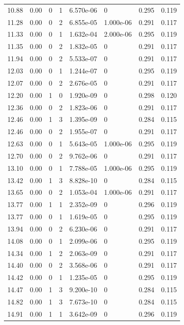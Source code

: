 \documentclass[preview]{standalone}
\begin{document}
{{{\begin{tabular}{L{1.2cm}C{1.2cm} C{0.3cm}C{0.5cm} C{1.4cm}C{1.4cm} C{1.4cm}C{1.4cm}}
  10.88  &  0.00  & 0     &  1 &  6.570e-06  & 0  & 0.295 &  0.119   \\ 
  11.28  &  0.00  & 0     &  2 &  6.855e-05  & 1.000e-06  & 0.291 &  0.117   \\ 
  11.33  &  0.00  & 0     &  1 &  1.632e-04  & 2.000e-06  & 0.295 &  0.119   \\ 
  11.35  &  0.00  & 0     &  2 &  1.832e-05  & 0  & 0.291 &  0.117   \\ 
  11.94  &  0.00  & 0     &  2 &  5.533e-07  & 0  & 0.291 &  0.117   \\ 
  12.03  &  0.00  & 0     &  1 &  1.244e-07  & 0  & 0.295 &  0.119   \\ 
  12.07  &  0.00  & 0     &  2 &  2.676e-05  & 0  & 0.291 &  0.117   \\ 
  12.20  &  0.00  & 1     &  0 &  1.920e-09  & 0  & 0.298 &  0.120   \\ 
  12.36  &  0.00  & 0     &  2 &  1.823e-06  & 0  & 0.291 &  0.117   \\ 
  12.46  &  0.00  & 1     &  3 &  1.395e-09  & 0  & 0.284 &  0.115   \\ 
  12.46  &  0.00  & 0     &  2 &  1.955e-07  & 0  & 0.291 &  0.117   \\ 
  12.63  &  0.00  & 0     &  1 &  5.643e-05  & 1.000e-06  & 0.295 &  0.119   \\ 
  12.70  &  0.00  & 0     &  2 &  9.762e-06  & 0  & 0.291 &  0.117   \\ 
  13.10  &  0.00  & 0     &  1 &  7.788e-05  & 1.000e-06  & 0.295 &  0.119   \\ 
  13.42  &  0.00  & 1     &  3 &  8.828e-10  & 0  & 0.284 &  0.115   \\ 
  13.65  &  0.00  & 0     &  2 &  1.053e-04  & 1.000e-06  & 0.291 &  0.117   \\ 
  13.77  &  0.00  & 1     &  1 &  2.352e-09  & 0  & 0.296 &  0.119   \\ 
  13.77  &  0.00  & 0     &  1 &  1.619e-05  & 0  & 0.295 &  0.119   \\ 
  13.94  &  0.00  & 0     &  2 &  6.230e-06  & 0  & 0.291 &  0.117   \\ 
  14.08  &  0.00  & 0     &  1 &  2.099e-06  & 0  & 0.295 &  0.119   \\ 
  14.34  &  0.00  & 1     &  2 &  2.063e-09  & 0  & 0.291 &  0.117   \\ 
  14.40  &  0.00  & 0     &  2 &  3.568e-06  & 0  & 0.291 &  0.117   \\ 
  14.42  &  0.00  & 0     &  1 &  1.235e-05  & 0  & 0.295 &  0.119   \\ 
  14.47  &  0.00  & 1     &  3 &  9.200e-10  & 0  & 0.284 &  0.115   \\ 
  14.82  &  0.00  & 1     &  3 &  7.673e-10  & 0  & 0.284 &  0.115   \\ 
  14.91  &  0.00  & 1     &  1 &  3.642e-09  & 0  & 0.296 &  0.119   \\ 
\hline 
\end{tabular} 

}}}
\end{document}
